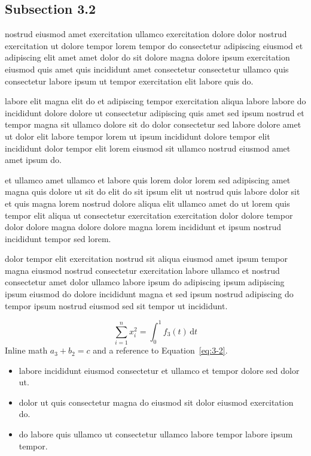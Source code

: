\documentclass{article}
\begin{document}
\subsection{Subsection 3.2}\label{sec:3-2}
nostrud eiusmod amet exercitation ullamco exercitation dolore dolor nostrud exercitation ut dolore tempor lorem tempor do consectetur adipiscing eiusmod et adipiscing elit amet amet dolor do sit dolore magna dolore ipsum exercitation eiusmod quis amet quis incididunt amet consectetur consectetur ullamco quis consectetur labore ipsum ut tempor exercitation elit labore quis do.

labore elit magna elit do et adipiscing tempor exercitation aliqua labore labore do incididunt dolore dolore ut consectetur adipiscing quis amet sed ipsum nostrud et tempor magna sit ullamco dolore sit do dolor consectetur sed labore dolore amet ut dolor elit labore tempor lorem ut ipsum incididunt dolore tempor elit incididunt dolor tempor elit lorem eiusmod sit ullamco nostrud eiusmod amet amet ipsum do.

et ullamco amet ullamco et labore quis lorem dolor lorem sed adipiscing amet magna quis dolore ut sit do elit do sit ipsum elit ut nostrud quis labore dolor sit et quis magna lorem nostrud dolore aliqua elit ullamco amet do ut lorem quis tempor elit aliqua ut consectetur exercitation exercitation dolor dolore tempor dolor dolore magna dolore dolore magna lorem incididunt et ipsum nostrud incididunt tempor sed lorem.

dolor tempor elit exercitation nostrud sit aliqua eiusmod amet ipsum tempor magna eiusmod nostrud consectetur exercitation labore ullamco et nostrud consectetur amet dolor ullamco labore ipsum do adipiscing ipsum adipiscing ipsum eiusmod do dolore incididunt magna et sed ipsum nostrud adipiscing do tempor ipsum nostrud eiusmod sed sit tempor ut incididunt.

\begin{equation}\label{eq:3-2}
  \sum_{i=1}^{n} x_i^{2} = \int_0^1 f_{3}(t)\,\mathrm{d}t
\end{equation}
Inline math $a_{3} + b_{2} = c$ and a reference to Equation~\eqref{eq:3-2}.

\begin{itemize}
  \item labore incididunt eiusmod consectetur et ullamco et tempor dolore sed dolor ut.
  \item dolor ut quis consectetur magna do eiusmod sit dolor eiusmod exercitation do.
  \item do labore quis ullamco ut consectetur ullamco labore tempor labore ipsum tempor.
\end{itemize}
\end{document}
